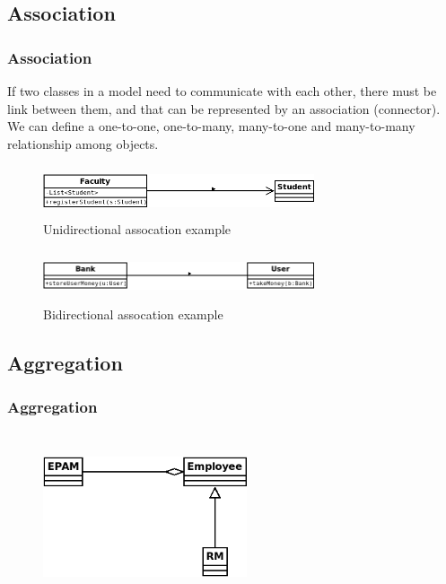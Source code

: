 \documentclass[10pt,xcolor={usenames,dvipsnames}]{beamer}
\begin{document}
\subsection{Association}
\begin{frame}[fragile]
	\frametitle{Association}
	\begin{exampleblock}{}
	If two classes in a model need to communicate with each other, there must be link between them, and that can be represented by an association (connector).
	We can define a one-to-one, one-to-many, many-to-one and many-to-many relationship among objects.
	\end{exampleblock}

	\begin{figure}
		\includegraphics[height=1.5cm,width=8cm]{unidir-association.png}
		\caption{Unidirectional assocation example}
	\end{figure}

	\begin{figure}
		\includegraphics[height=1.5cm,width=8cm]{bidir-association.png}
		\caption{Bidirectional assocation example}
	\end{figure}
\end{frame}

\subsection{Aggregation}
\begin{frame}[fragile]
	\frametitle{Aggregation}
		\begin{figure}
			\includegraphics[height=5cm,width=6cm]{aggregation.png}
		\end{figure}
\end{frame}
\end{document}
